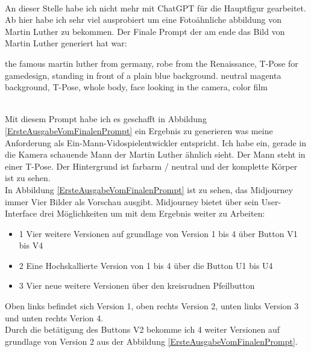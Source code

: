 \\
An dieser Stelle habe ich nicht mehr mit ChatGPT für die Hauptfigur gearbeitet. Ab hier habe ich sehr viel ausprobiert um eine Fotoähnliche abbildung von Martin Luther zu bekommen. Der Finale Prompt der am ende das Bild von Martin Luther generiert hat war:
\\
\rmfamily
\begin{large}
	the famous martin luther from germany, robe from the Renaissance, T-Pose for gamedesign, standing in front of a plain blue background. neutral magenta background, T-Pose, whole body, face looking in the camera, color film
\end{large}
\sffamily
\\
Mit diesem Prompt habe ich es geschafft in Abbildung \ref{ErsteAusgabeVomFinalenPrompt} ein Ergebnis zu generieren was meine Anforderung als Ein-Mann-Vidospielentwickler entspricht. Ich habe ein, gerade in die Kamera schauende Mann der Martin Luther ähnlich sieht. Der Mann steht in einer T-Pose. Der Hintergrund ist farbarm / neutral und der komplette Körper ist zu sehen. 
\\
In Abbildung \ref{ErsteAusgabeVomFinalenPrompt} ist zu sehen, das Midjourney immer Vier Bilder als Vorschau ausgibt. Midjourney bietet über sein User-Interface drei Möglichkeiten um mit dem Ergebnis weiter zu Arbeiten:
\begin{itemize}
	\item 1 Vier weitere Versionen auf grundlage von Version 1 bis 4 über Button V1 bis V4
	\item 2 Eine Hochskallierte Version von 1 bis 4 über die Button U1 bis U4
	\item 3 Vier neue weitere Versionen über den kreisrudnen Pfeilbutton
\end{itemize}
Oben links befindet sich Version 1, oben rechts Version 2, unten links Version 3 und unten rechts Verion 4.
\\
Durch die betätigung des Buttons V2 bekomme ich 4 weiter Versionen auf grundlage von Version 2 aus der Abbildung \ref{ErsteAusgabeVomFinalenPrompt}.
